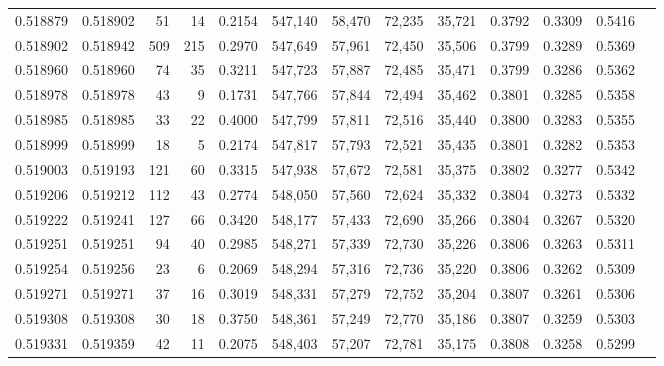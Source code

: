 \begin{tabular}{rrrrrrrrrrrrr}
0.518879 & 0.518902 &    51 &    14 &                                     0.2154 & 547,140 &  58,470 &  72,235 &  35,721 & 0.3792 & 0.3309 & 0.5416 \\
0.518902 & 0.518942 &   509 &   215 &                                     0.2970 & 547,649 &  57,961 &  72,450 &  35,506 & 0.3799 & 0.3289 & 0.5369 \\
0.518960 & 0.518960 &    74 &    35 &                                     0.3211 & 547,723 &  57,887 &  72,485 &  35,471 & 0.3799 & 0.3286 & 0.5362 \\
0.518978 & 0.518978 &    43 &     9 &                                     0.1731 & 547,766 &  57,844 &  72,494 &  35,462 & 0.3801 & 0.3285 & 0.5358 \\
0.518985 & 0.518985 &    33 &    22 &                                     0.4000 & 547,799 &  57,811 &  72,516 &  35,440 & 0.3800 & 0.3283 & 0.5355 \\
0.518999 & 0.518999 &    18 &     5 &                                     0.2174 & 547,817 &  57,793 &  72,521 &  35,435 & 0.3801 & 0.3282 & 0.5353 \\
0.519003 & 0.519193 &   121 &    60 &                                     0.3315 & 547,938 &  57,672 &  72,581 &  35,375 & 0.3802 & 0.3277 & 0.5342 \\
0.519206 & 0.519212 &   112 &    43 &                                     0.2774 & 548,050 &  57,560 &  72,624 &  35,332 & 0.3804 & 0.3273 & 0.5332 \\
0.519222 & 0.519241 &   127 &    66 &                                     0.3420 & 548,177 &  57,433 &  72,690 &  35,266 & 0.3804 & 0.3267 & 0.5320 \\
0.519251 & 0.519251 &    94 &    40 &                                     0.2985 & 548,271 &  57,339 &  72,730 &  35,226 & 0.3806 & 0.3263 & 0.5311 \\
0.519254 & 0.519256 &    23 &     6 &                                     0.2069 & 548,294 &  57,316 &  72,736 &  35,220 & 0.3806 & 0.3262 & 0.5309 \\
0.519271 & 0.519271 &    37 &    16 &                                     0.3019 & 548,331 &  57,279 &  72,752 &  35,204 & 0.3807 & 0.3261 & 0.5306 \\
0.519308 & 0.519308 &    30 &    18 &                                     0.3750 & 548,361 &  57,249 &  72,770 &  35,186 & 0.3807 & 0.3259 & 0.5303 \\
0.519331 & 0.519359 &    42 &    11 &                                     0.2075 & 548,403 &  57,207 &  72,781 &  35,175 & 0.3808 & 0.3258 & 0.5299 \\

\end{tabular}
